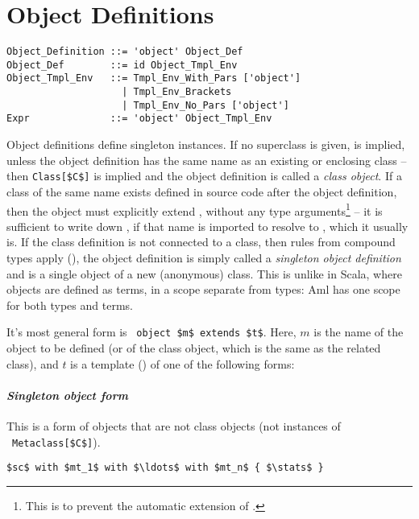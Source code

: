 \section{Object Definitions}
\label{sec:object-definitions}

\grammar\begin{lstlisting}
Object_Definition ::= 'object' Object_Def
Object_Def        ::= id Object_Tmpl_Env
Object_Tmpl_Env   ::= Tmpl_Env_With_Pars ['object']
                    | Tmpl_Env_Brackets
                    | Tmpl_Env_No_Pars ['object']
Expr              ::= 'object' Object_Tmpl_Env
\end{lstlisting}

Object definitions define singleton instances. If no superclass is given,  is implied, unless the object definition has the same name as an existing or enclosing class -- then \lstinline!Class[$C$]! is implied and the object definition is called a {\em class object}. If a class of the same name exists defined in source code after the object definition, then the object must explicitly extend , without any type arguments\footnote{This is to prevent the automatic extension of .} -- it is sufficient to write down , if that name is imported to resolve to , which it usually is. If the class definition is not connected to a class, then rules from compound types apply (), the object definition is simply called a {\em singleton object definition} and is a single object of a new (anonymous) class. This is unlike in Scala, where objects are defined as terms, in a scope separate from types: Aml has one scope for both types and terms. 

It's most general form is ~\lstinline!object $m$ extends $t$!. Here, $m$ is the name of the object to be defined (or of the class object, which is the same as the related class), and $t$ is a template () of one of the following forms:

\paragraph{\em Singleton object form}
This is a form of objects that are not class objects (not instances of ~\lstinline!Metaclass[$C$]!). 
\begin{lstlisting}
$sc$ with $mt_1$ with $\ldots$ with $mt_n$ { $\stats$ }
\end{lstlisting}

